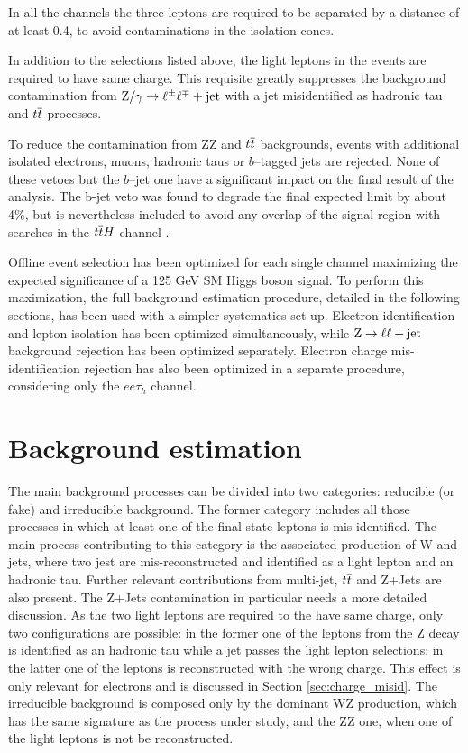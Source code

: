 In all the channels the three leptons are required to be separated by a \DR distance of at least 0.4, to avoid contaminations in the isolation cones.

In addition to the selections listed above, the light leptons in the events are required to have same charge. This requisite greatly suppresses the background contamination from $\mathrm{Z}/\gamma \to \ell^\pm \ell^\mp + \mathrm{jet}$ with a jet misidentified as hadronic tau and $t\overline{t}$ processes.

To reduce the contamination from ZZ and $t\overline{t}$ backgrounds, events with additional isolated electrons, muons, hadronic taus or $b$--tagged jets are rejected. None of these vetoes but the $b$--jet one
have a significant impact on the final result of the analysis. The b-jet veto was found to degrade the final expected limit by about 4\%, but is nevertheless included to avoid any overlap of the
signal region with searches in the $t\overline{t}H$ channel \cite{CMS-PAS-HIG-13-019}.

Offline event selection has been optimized for each single channel maximizing the expected significance of a 125 GeV SM Higgs boson signal. To perform this maximization, the full background estimation procedure, detailed in the following sections, has been used with a simpler systematics set-up. Electron identification and lepton isolation has been optimized simultaneously, while $\mathrm{Z}\rightarrow\ell\ell+\mathrm{jet}$ background rejection has been optimized separately. Electron charge mis-identification rejection has also been optimized in a separate procedure, considering only the $ee\tau_h$ channel.

\section{Background estimation}

The main background processes can be divided into two categories: reducible (or fake) and irreducible background. The former category includes all those processes in which at least one of the final state leptons is mis-identified. The main process contributing to this category is the associated production of W and jets, where two jest are mis-reconstructed and identified as a light lepton and an hadronic tau. Further relevant contributions from multi-jet, $t\overline{t}$ and Z+Jets are also present. The Z+Jets contamination in particular needs a more detailed discussion. As the two light leptons are required to the have same charge, only two configurations are possible: in the former one of the leptons from the Z decay is identified as an hadronic tau while a jet passes the light lepton selections; in the latter one of the leptons is reconstructed with the wrong charge. This effect is only relevant for electrons and is discussed in Section \ref{sec:charge_misid}. The irreducible background is composed only by the dominant WZ production, which has the same signature as the process under study, and the ZZ one, when one of the light leptons is not be reconstructed.

